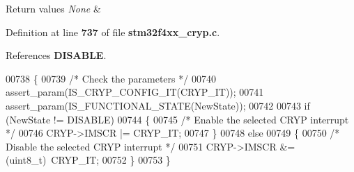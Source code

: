\begin{DoxyRetVals}{Return values}
{\em None} & \\
\hline
\end{DoxyRetVals}


Definition at line \textbf{ 737} of file \textbf{ stm32f4xx\+\_\+cryp.\+c}.



References \textbf{ D\+I\+S\+A\+B\+LE}.


\begin{DoxyCode}
00738 \{
00739   \textcolor{comment}{/* Check the parameters */}
00740   assert_param(IS_CRYP_CONFIG_IT(CRYP\_IT));
00741   assert_param(IS_FUNCTIONAL_STATE(NewState));
00742 
00743   \textcolor{keywordflow}{if} (NewState != DISABLE)
00744   \{
00745     \textcolor{comment}{/* Enable the selected CRYP interrupt */}
00746     CRYP->IMSCR |= CRYP\_IT;
00747   \}
00748   \textcolor{keywordflow}{else}
00749   \{
00750     \textcolor{comment}{/* Disable the selected CRYP interrupt */}
00751     CRYP->IMSCR &= (uint8\_t)~CRYP\_IT;
00752   \}
00753 \}
\end{DoxyCode}
